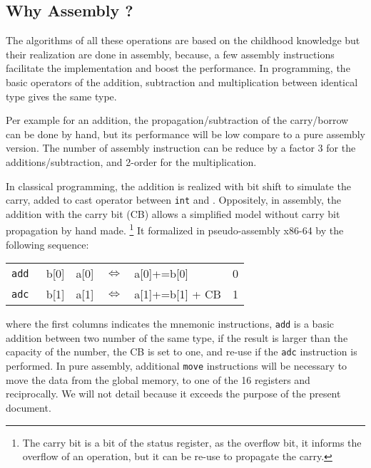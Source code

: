 \documentclass[11pt]{amsart}
\begin{document}
\subsection*{Why Assembly ?}

The algorithms of all these operations are based on the childhood knowledge but their realization are done in assembly, because, a few assembly instructions facilitate the implementation and boost the performance.
In programming, the basic operators of the addition, subtraction and multiplication between identical type gives the same type. 

Per example for an addition, the propagation/subtraction of the  carry/borrow can be done by hand, but its performance will be low compare to a pure assembly version. 
The number of assembly instruction can be reduce by a factor 3 for the additions/subtraction, and  2-order for the multiplication.

In classical programming, the addition is realized with bit shift to simulate the carry, added to cast operator between  \texttt{int} and . Oppositely, 
in assembly, the addition with the carry bit (CB) allows a simplified model without  carry bit propagation by hand made. \footnote{ The carry bit is a bit of the status register, as the overflow bit, 
it informs  the overflow of an operation, but it can be re-use to propagate the carry. }  It formalized in pseudo-assembly x86-64 by the following sequence:
\begin{table}[htdp]
\begin{center}
\begin{tabular}{ l c c c l c}
 \texttt{add }   &  b[0]  & a[0]    & $\Leftrightarrow$ & a[0]+=b[0]            & \tiny{0}  \\ 
 \texttt{adc }   &  b[1]   & a[1]   & $\Leftrightarrow$ & a[1]+=b[1] + CB  & \tiny{1}  \\  
\end{tabular}
\end{center}
\end{table}%
where the first columns indicates the  mnemonic instructions, \texttt{add} is a basic addition between two number of the same type, if the result is larger than the capacity of the number, the CB is set to one,
and re-use if the \texttt{adc} instruction is performed. In pure assembly, additional \texttt{move} instructions will be necessary to move the data from the global memory, to one of the 16 registers and reciprocally.
We will not detail because it exceeds the purpose of the present document. 
\end{document}
